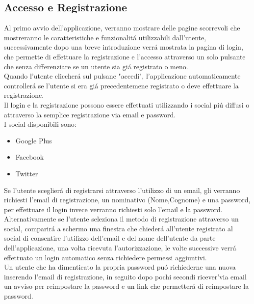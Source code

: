 \subsection{Accesso e Registrazione}
Al primo avvio dell'applicazione, verranno mostrare delle pagine scorrevoli che mostreranno le caratteristiche e funzionalit\'a utilizzabili dall'utente, successivamente dopo una breve introduzione verr\'a mostrata la pagina di login, che permette di effettuare la registrazione e l'accesso attraverso un solo pulsante che senza differenziare se un utente sia gi\'a registrato o meno.\\
Quando l'utente cliccher\'a sul pulsane "accedi", l'applicazione automaticamente controller\'a se l'utente si era gi\'a precedentemene registrato o deve effettuare la registrazione.\\
Il login e la registrazione possono essere effettuati utilizzando i social pi\'u diffusi o attraverso la semplice registrazione via email e password.\\
I social disponibili sono:
\begin{itemize}
  \item Google Plus
  \item Facebook
  \item Twitter
\end{itemize}
Se l'utente sceglier\'a di registrarsi attraverso l'utilizzo di un email, gli verranno richiesti l'email di registrazione, un nominativo (Nome,Cognome) e una password, per effettuare il login invece verranno richiesti solo l'email e la password.\\
Alternativamente se l'utente seleziona il metodo di registrazione attraverso un social, comparir\'a a schermo una finestra che chieder\'a all'utente registrato al social di consentire l'utilizzo dell'email e del nome dell'utente da parte dell'applicazione, una volta ricevuta l'autorizzazione, le volte successive verr\'a effettuato un login automatico senza richiedere permessi aggiuntivi.\\
Un utente che ha dimenticato la propria password pu\'o richiederne una nuova inserendo l'email di registrazione, in seguito dopo pochi secondi ricever'\a via email un avviso per reimpostare la password e un link che permetter\'a di reimpostare la password.\\

\newpage

